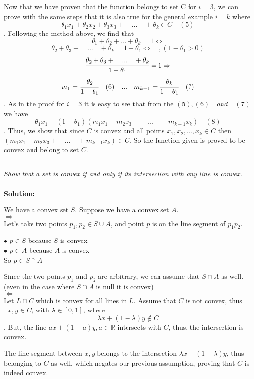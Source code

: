 \documentclass[10pt]{article}
\newcommand{\R}{\mathbb{R}}
\begin{document}
  	  Now that we have proven that the function belongs to set C for $i = 3$, we can prove with the same steps that it is also true for the general example $i = k$ where $$\theta_1 x_1 + \theta_2 x_2 + \theta_3 x_3 +\quad . . .\quad +\theta_k \in C\quad (5)$$. Following the method above, we find that $$\theta_1 + \theta_2 + ... + \theta_k = 1 \iff$$ $$\theta_2 + \theta_3 +\quad . . .\quad + \theta_k = 1 - \theta_1 \iff \quad,   (1 - \theta_1 > 0)$$ $$\cfrac{\theta_2 + \theta_3 +\quad . . .\quad +\theta_k}{1-\theta_1} = 1 \Rightarrow$$ $$m_1 = \cfrac{\theta_2}{1-\theta_1}\quad (6)\quad . . .\quad m_{k-1} = \cfrac{\theta_k}{1 - \theta_1}\quad (7)$$. As in the proof for $i = 3$ it is easy to see that from the $(5), (6)\quad and\quad (7)$ we have $$\theta_1 x_1 + (1 - \theta_1)(m_1 x_1 + m_2 x_3 +\quad . . .\quad + m_{k-1} x_k)\quad (8)$$. Thus, we show that since $C$ is convex and all points $x_1, x_2, ..., x_k \in C$ then $(m_1 x_1 + m_2 x_3 +\quad . . .\quad + m_{k-1} x_k) \in C$. So the function given is proved to be convex and belong to set $C$.
  	\newpage
  	
  	
  	\begin{center}
  	\section{}
  	\end{center}\par
  	\textit{Show that a set is convex if and only if its intersection with any line is convex.}\\ \\
  	\textbf{Solution:}\\ \par
  	We have a convex set $S$. Suppose we have a convex set $A$.\\
  	\textbf{$\Rightarrow$}\\
  	Let's take two points $p_1, p_2 \in S \cup A$, and point $p$ is on the line segment of $p_1p_2$.
  	\begin{center}
  	$\bullet$  $p \in S$ because $S$ is convex\\
  	$\bullet$  $p \in A$ because $A$ is convex\\
  	So $p \in S \cap A$\\
  	\end{center}
  	Since the two points $p_1$ and $p_2$ are arbitrary, we can assume that $S \cap A$ as well. (even in the case where $S \cap A$ is null it is convex) \\
  	\textbf{$\Leftarrow$}\\
  	Let $L \cap C$ which is convex for all lines in $L$. Assume that $C$ is not convex, thus $\exists x,y \in C$, with $\lambda \in [0,1]$, where $$\lambda x + (1 - \lambda)y \notin C$$. But, the line $ax + (1 - a)y, a \in \R$ intersects with $C$, thus, the intersection is convex.\par 
  	The line segment between $x,y$ belongs to the intersection $\lambda x + (1 - \lambda)y$, thus belonging to $C$ as well, which negates our previous assumption, proving that $C$ is indeed convex.
  	\newpage
  	
\end{document}
